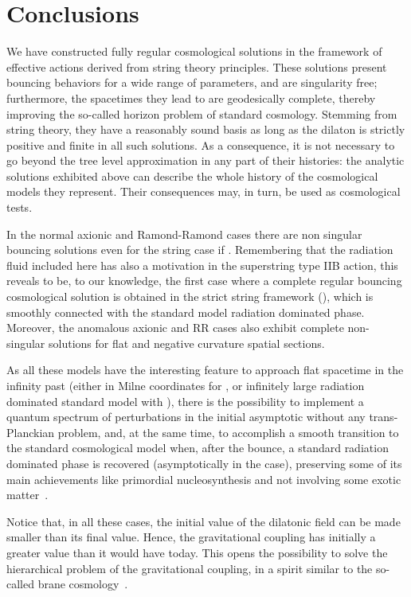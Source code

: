 \documentclass[a4paper,aps,twocolumn,prd,showpacs,nofootinbib]{revtex4}
\begin{document}
\section{Conclusions}

We have constructed fully regular cosmological solutions in the
framework of effective actions derived from string theory
principles. These solutions present bouncing behaviors for a wide
range of parameters, and are singularity free; furthermore, the
spacetimes they lead to are geodesically complete, thereby improving
the so-called horizon problem of standard cosmology. Stemming from
string theory, they have a reasonably sound basis as long as the
dilaton is strictly positive and finite in all such solutions. As a
consequence, it is not necessary to go beyond the tree level
approximation in any part of their histories: the analytic solutions
exhibited above can describe the whole history of the cosmological
models they represent.  Their consequences may, in turn, be used as
cosmological tests.

In the normal axionic and Ramond-Ramond cases there are non singular
bouncing solutions even for the string case if \coordHE{}. Remembering
that the radiation fluid included here has also a motivation in the
superstring type IIB action, this reveals to be, to our knowledge, the
first case where a complete regular bouncing cosmological solution is
obtained in the strict string framework (\coordHE{}), which is
smoothly connected with the standard model radiation dominated
phase. Moreover, the anomalous axionic and RR cases also exhibit
complete non-singular solutions for flat and negative curvature
spatial sections.

As all these models have the interesting feature to approach flat
spacetime in the infinity past (either in Milne coordinates for
\coordHE{}, or infinitely large radiation dominated standard model with
\coordHE{}), there is the possibility to implement a quantum spectrum of
perturbations in the initial asymptotic without any trans-Planckian
problem, and, at the same time, to accomplish a smooth transition to
the standard cosmological model when, after the bounce, a standard
radiation dominated phase is recovered (asymptotically in the \coordHE{}
case), preserving some of its main achievements like primordial
nucleosynthesis and not involving some exotic matter~\cite{ppnpn2}.

Notice that, in all these cases, the initial value of the dilatonic
field can be made smaller than its final value. Hence, the
gravitational coupling has initially a greater value than it would
have today. This opens the possibility to solve the hierarchical
problem of the gravitational coupling, in a spirit similar to the
so-called brane cosmology~\cite{langlois}.
\end{document}
